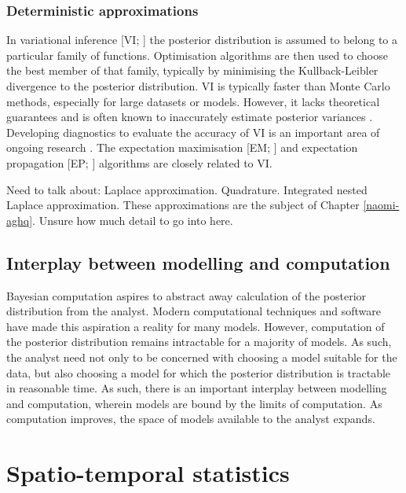 \documentclass[a4paper, nobind]{templates/ociamthesis}
\begin{document}
\hypertarget{deterministic-approximations}{%
\subsubsection{Deterministic approximations}\label{deterministic-approximations}}

In variational inference {[}VI; \textcite{blei2017variational}{]} the posterior distribution is assumed to belong to a particular family of functions.
Optimisation algorithms are then used to choose the best member of that family, typically by minimising the Kullback-Leibler divergence to the posterior distribution.
VI is typically faster than Monte Carlo methods, especially for large datasets or models.
However, it lacks theoretical guarantees and is often known to inaccurately estimate posterior variances \autocite{giordano2018covariances}.
Developing diagnostics to evaluate the accuracy of VI is an important area of ongoing research \autocite{yao2018yes}.
The expectation maximisation {[}EM; \textcite{dempster1977maximum}{]} and expectation propagation {[}EP; \textcite{minka2001expectation}{]} algorithms are closely related to VI.

Need to talk about:
Laplace approximation.
Quadrature.
Integrated nested Laplace approximation.
These approximations are the subject of Chapter \ref{naomi-aghq}.
Unsure how much detail to go into here.

\hypertarget{interplay-between-modelling-and-computation}{%
\subsection{Interplay between modelling and computation}\label{interplay-between-modelling-and-computation}}

Bayesian computation aspires to abstract away calculation of the posterior distribution from the analyst.
Modern computational techniques and software have made this aspiration a reality for many models.
However, computation of the posterior distribution remains intractable for a majority of models.
As such, the analyst need not only to be concerned with choosing a model suitable for the data, but also choosing a model for which the posterior distribution is tractable in reasonable time.
As such, there is an important interplay between modelling and computation, wherein models are bound by the limits of computation.
As computation improves, the space of models available to the analyst expands.

\hypertarget{spatio-temporal-statistics}{%
\section{Spatio-temporal statistics}\label{spatio-temporal-statistics}}
\end{document}
